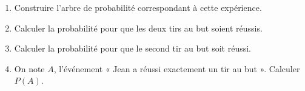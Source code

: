 \documentclass[11pt]{article}
\begin{document}
\begin{enumerate}
  \item Construire l'arbre de probabilité correspondant à cette expérience.
  \item Calculer la probabilité pour que les deux tirs au but soient réussis.
  \item Calculer la probabilité pour que le second tir au but soit réussi.
  \item On note $A$, l'événement « Jean a réussi exactement un tir au but ». Calculer $P(A)$.
\end{enumerate}
\end{document}
